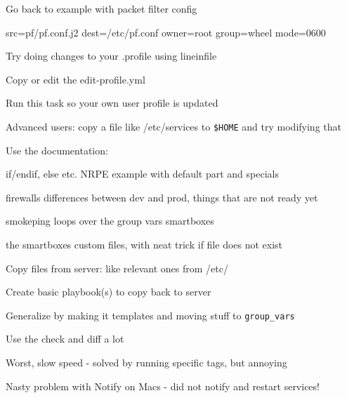 \documentclass[18pt,landscape,a4paper,footrule]{foils}
\begin{document}

Go back to example with packet filter config

 src=pf/pf.conf.j2
        dest=/etc/pf.conf owner=root group=wheel mode=0600





Try doing changes to your .profile using lineinfile

\begin{list2}
\item Copy or edit the edit-profile.yml
\item Run this task so your own user profile is updated
\item Advanced users: copy a file like /etc/services to \verb+$HOME+ and try modifying that
\item
\end{list2}

Use the documentation:\\




if/endif, else etc. NRPE example with default part and specials

firewalls differences between dev and prod, things that are not ready yet

smokeping loops over the group vars smartboxes

the smartboxes custom files, with neat trick if file does not exist



\begin{list2}
\item Copy files from server: like relevant ones from /etc/
\item Create basic playbook(s) to copy back to server
\item Generalize by making it templates and moving stuff to \verb+group_vars+
\end{list2}

\centerline{Use the check and diff a lot \smiley}



\begin{list2}
\item Worst, slow speed - solved by running specific tags, but annoying
\item Nasty problem with Notify on Macs - did not notify and restart services!
\end{list2}
\end{document}
